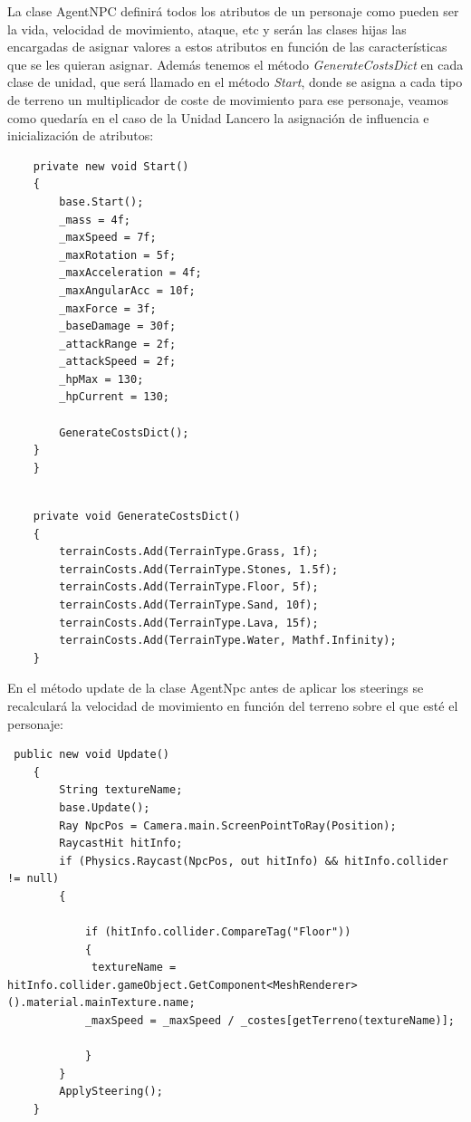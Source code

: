 La clase AgentNPC definirá todos los atributos de un personaje como pueden ser la vida, velocidad de movimiento, ataque, etc y serán las clases hijas las encargadas de asignar valores a estos atributos en función de las características que se les quieran asignar. Además tenemos el método \textit{GenerateCostsDict} en cada clase de unidad, que será llamado en el método \textit{Start}, donde se asigna a cada tipo de terreno un multiplicador de coste de movimiento para ese personaje, veamos como quedaría en el caso de la Unidad Lancero la asignación de influencia e inicialización de atributos:
\begin{lstlisting}
    private new void Start()
    {
        base.Start();
        _mass = 4f;
        _maxSpeed = 7f;
        _maxRotation = 5f;
        _maxAcceleration = 4f;
        _maxAngularAcc = 10f;
        _maxForce = 3f;
        _baseDamage = 30f;
        _attackRange = 2f;
        _attackSpeed = 2f;
        _hpMax = 130;
        _hpCurrent = 130;
        
        GenerateCostsDict();
    }
    } \end{lstlisting}
\begin{lstlisting}

    private void GenerateCostsDict()
    {
        terrainCosts.Add(TerrainType.Grass, 1f);
        terrainCosts.Add(TerrainType.Stones, 1.5f);
        terrainCosts.Add(TerrainType.Floor, 5f);
        terrainCosts.Add(TerrainType.Sand, 10f);
        terrainCosts.Add(TerrainType.Lava, 15f);
        terrainCosts.Add(TerrainType.Water, Mathf.Infinity);
    } \end{lstlisting}

En el método update de la clase AgentNpc antes de aplicar los steerings se recalculará la velocidad de movimiento en función del terreno   sobre el que esté el personaje:
\begin{lstlisting}
 public new void Update()
    {
        String textureName;
        base.Update();
        Ray NpcPos = Camera.main.ScreenPointToRay(Position);
        RaycastHit hitInfo;
        if (Physics.Raycast(NpcPos, out hitInfo) && hitInfo.collider != null)
        {

            if (hitInfo.collider.CompareTag("Floor"))
            {
             textureName = hitInfo.collider.gameObject.GetComponent<MeshRenderer>().material.mainTexture.name;
            _maxSpeed = _maxSpeed / _costes[getTerreno(textureName)];

            }
        }
        ApplySteering();
    }
\end{lstlisting}

